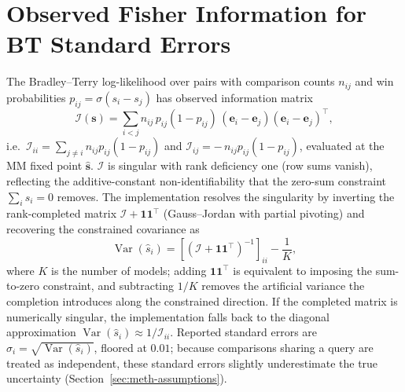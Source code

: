 \section{Observed Fisher Information for BT Standard Errors}\label{sec:num-fisher}

The Bradley--Terry log-likelihood over pairs with comparison counts
$n_{ij}$ and win probabilities
$p_{ij} = \sigma(s_i - s_j)$ has observed information matrix
\[
\mathcal{I}(\mathbf{s})
= \sum_{i < j} n_{ij}\, p_{ij} (1 - p_{ij})\,
(\mathbf{e}_i - \mathbf{e}_j)(\mathbf{e}_i - \mathbf{e}_j)^\top,
\]
i.e.\ $\mathcal{I}_{ii} = \sum_{j \neq i} n_{ij} p_{ij}(1-p_{ij})$
and $\mathcal{I}_{ij} = -\,n_{ij} p_{ij}(1-p_{ij})$, evaluated at the
MM fixed point $\hat{\mathbf{s}}$.
$\mathcal{I}$ is singular with rank deficiency one (row sums vanish),
reflecting the additive-constant non-identifiability that the
zero-sum constraint $\sum_i s_i = 0$ removes.
The implementation resolves the singularity by inverting the
rank-completed matrix $\mathcal{I} + \mathbf{1}\mathbf{1}^\top$
(Gauss--Jordan with partial pivoting) and recovering the
constrained covariance as
\[
\operatorname{Var}(\hat{s}_i)
= \left[(\mathcal{I} + \mathbf{1}\mathbf{1}^\top)^{-1}\right]_{ii}
- \frac{1}{K},
\]
where $K$ is the number of models; adding
$\mathbf{1}\mathbf{1}^\top$ is equivalent to imposing the sum-to-zero
constraint, and subtracting $1/K$ removes the artificial variance the
completion introduces along the constrained direction.
If the completed matrix is numerically singular, the implementation
falls back to the diagonal approximation
$\operatorname{Var}(\hat{s}_i) \approx 1/\mathcal{I}_{ii}$.
Reported standard errors are
$\hat{\sigma}_i = \sqrt{\operatorname{Var}(\hat{s}_i)}$, floored at
$0.01$; because comparisons sharing a query are treated as
independent, these standard errors slightly underestimate the true
uncertainty (Section~\ref{sec:meth-assumptions}).
